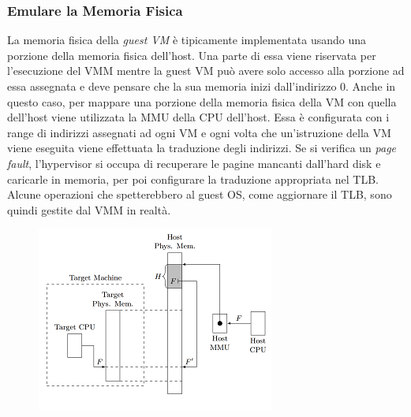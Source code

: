 \documentclass{article}
\begin{document}
\subsubsection{Emulare la Memoria Fisica}
La memoria fisica della \textit{guest VM} è tipicamente implementata usando una porzione della memoria fisica dell’host. Una parte di essa viene riservata per l’esecuzione del VMM mentre la guest VM può avere solo accesso alla porzione ad essa assegnata e deve pensare che la sua memoria inizi dall’indirizzo 0.
Anche in questo caso, per mappare una porzione della memoria fisica della VM con quella dell’host viene utilizzata la MMU della CPU dell’host. Essa è configurata con i range di indirizzi assegnati ad ogni VM e ogni volta che un’istruzione della VM viene eseguita viene effettuata la traduzione degli indirizzi.
Se si verifica un \textit{page fault}, l’hypervisor si occupa di recuperare le pagine mancanti dall’hard disk e caricarle in memoria, per poi configurare la traduzione appropriata nel TLB. 
Alcune operazioni che spetterebbero al guest OS, come aggiornare il TLB, sono quindi gestite dal VMM in realtà.
\begin{figure}[H]
    \centering
    \includegraphics[scale=0.8]{img/Virt_tech/13.png}   
    \caption{}
\end{figure}\noindent
\end{document}
